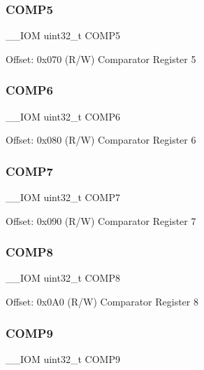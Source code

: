 \subsubsection{\texorpdfstring{COMP5}{COMP5}}
{\footnotesize\ttfamily \+\_\+\+\_\+\+I\+OM uint32\+\_\+t C\+O\+M\+P5}

Offset\+: 0x070 (R/W) Comparator Register 5 \mbox{\label{struct_d_w_t___type_a263131067f0ad2d04a2711962a455bfa}} 
\subsubsection{\texorpdfstring{COMP6}{COMP6}}
{\footnotesize\ttfamily \+\_\+\+\_\+\+I\+OM uint32\+\_\+t C\+O\+M\+P6}

Offset\+: 0x080 (R/W) Comparator Register 6 \mbox{\label{struct_d_w_t___type_a26932a20b1cd18331bbe245caf8a6a92}} 
\subsubsection{\texorpdfstring{COMP7}{COMP7}}
{\footnotesize\ttfamily \+\_\+\+\_\+\+I\+OM uint32\+\_\+t C\+O\+M\+P7}

Offset\+: 0x090 (R/W) Comparator Register 7 \mbox{\label{struct_d_w_t___type_a9b9d9bb4b4ecab022a3d88d9cae6b5e0}} 
\subsubsection{\texorpdfstring{COMP8}{COMP8}}
{\footnotesize\ttfamily \+\_\+\+\_\+\+I\+OM uint32\+\_\+t C\+O\+M\+P8}

Offset\+: 0x0\+A0 (R/W) Comparator Register 8 \mbox{\label{struct_d_w_t___type_a4e090c0e6b818b63724c774f38ccab14}} 
\subsubsection{\texorpdfstring{COMP9}{COMP9}}
{\footnotesize\ttfamily \+\_\+\+\_\+\+I\+OM uint32\+\_\+t C\+O\+M\+P9}

